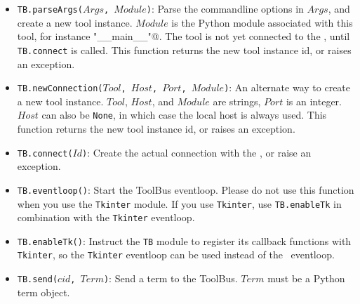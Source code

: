 \begin{itemize}

\item {\tt TB.parseArgs($Args$, $Module$)}:  Parse the commandline
      options in $Args$, and create a new tool instance. $Module$ is
      the Python module associated with this tool, for instance
      \verb@ "__main__"@. The tool is not yet connected to the \TB, until
      {\tt TB.connect} is called. This function returns the new tool
      instance id, or raises an exception.

\item {\tt TB.newConnection($Tool$, $Host$, $Port$, $Module$)}: An alternate
      way to create a new tool instance. $Tool$, $Host$, and $Module$ are
      strings, $Port$ is an integer. $Host$ can also be {\tt None}, in which
      case the local host is always used. This function returns the new
      tool instance id, or raises an exception.

\item {\tt TB.connect($Id$)}: Create the actual connection with the \TB,
      or raise an exception.

\item {\tt TB.eventloop()}: Start the ToolBus eventloop. Please do not use
      this function when you use the {\tt Tkinter} module. If you use
      {\tt Tkinter}, use {\tt TB.enableTk} in combination with the
      {\tt Tkinter} eventloop.

\item {\tt TB.enableTk()}: Instruct the {\tt TB} module to register
      its callback functions with {\tt Tkinter}, so the {\tt Tkinter}
      eventloop can be used instead of the \TB\ eventloop.

\item {\tt TB.send($cid$, $Term$)}: Send a term to the ToolBus. $Term$ must
      be a Python term object.


\end{itemize}
